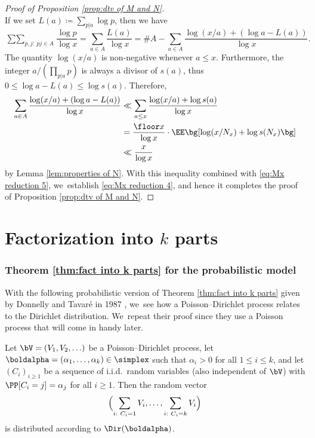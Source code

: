 \begin{proof}[Proof of Proposition \ref{prop:dtv of M and N}]
\begin{equation}
\end{equation}
If we set $L(a)\coloneqq \sum_{p|a}\log p$, then we have
\begin{equation}
\label{eq:Mx reduction 5}
\mathop{\sum\sum}_{p,j:\ pj \in A} \frac{\log p}{\log x} = \sum_{a\in A}\frac{L(a)}{\log x} = \# A
- \sum_{a\in A} \frac{\log(x/a) + (\log a - L(a))}{\log x}.
\end{equation}
The quantity $\log(x/a)$ is non-negative whenever $a \le x$. Furthermore, the integer $a/(\prod_{p|a} p)$ is always a divisor of $s(a)$, thus $0 \le \log a - L(a) \le \log s(a)$. Therefore,
\begin{align*}
\sum_{a\in A} \frac{\log(x/a) + (\log a - L(a))}{\log x} &\ll \sum_{a\le x} \frac{\log(x/a) + \log s(a)}{\log x} \\
&= \frac{\floor x}{\log x} \cdot \EE\bg[\log(x/N_x) + \log s(N_x)\bg] \\
&\ll \frac{x}{\log x}
\end{align*}
by Lemma \ref{lem:properties of N}. With this inequality combined with \eqref{eq:Mx reduction 5}, we~establish \eqref{eq:Mx reduction 4}, and hence it completes the proof of Proposition \ref{prop:dtv of M and N}.
\end{proof}

\part{Factorization into \texorpdfstring{$k$}{k} parts}\label{part:DDT}

\section{Theorem \ref{thm:fact into k parts} for the probabilistic model}\label{sec:Donnelly-Tavare}

With the following probabilistic version of Theorem \ref{thm:fact into k parts} given by Donnelly and Tavaré in 1987 \cite[\S 3]{DonnellyTavare87}, we~see how a Poisson--Dirichlet process relates to the Dirichlet distribution. We~repeat their proof since they use a Poisson process that will come in handy later.

\begin{prop}
\label{prop:probabilistic dirichlet law}
Let $\bV = (V_1, V_2, \ldots)$ be a Poisson--Dirichlet process, let $\boldalpha = (\alpha_1, \ldots, \alpha_k) \in \simplex$ such that $\alpha_i > 0$ for all $1 \le i \le k$, and let $(C_i)_{i \ge 1}$ be a sequence of i.i.d.~random variables (also independent of $\bV$) with $\PP[C_i = j] = \alpha_j$ for all $i \ge 1$. Then the random vector
\[
\Bigl(\sum_{i:\ C_i = 1} V_i, \ldots, \sum_{i:\ C_i = k} V_i\Bigr)
\]
is distributed according to $\Dir(\boldalpha)$.
\end{prop}

